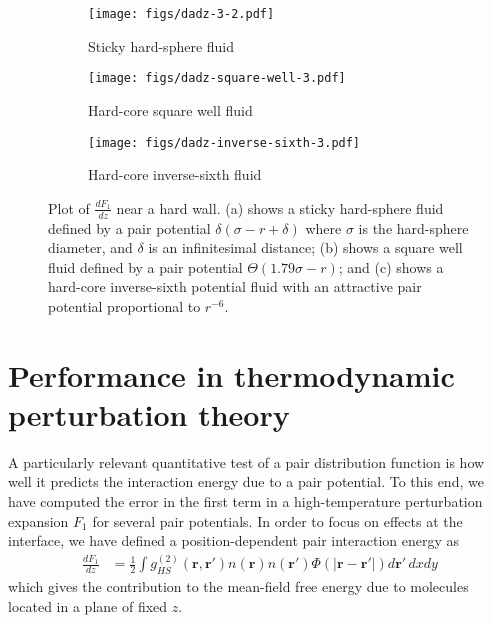 \documentclass[letterpaper,twocolumn,amsmath,amssymb,pre,aps,10pt]{revtex4-1}
\newcommand{\rr}{\textbf{r}}
\begin{document}
\begin{figure}
  \begin{subfigure}{1.0\columnwidth}
    \texttt{[image: figs/dadz-3-2.pdf]}
    \vspace{-0.8cm}
    \caption{Sticky hard-sphere fluid}\label{fig:dadz-delta}
  \end{subfigure}
  \begin{subfigure}{1.0\columnwidth}
    \texttt{[image: figs/dadz-square-well-3.pdf]}
    \vspace{-0.8cm}
    \caption{Hard-core square well fluid}\label{fig:dadz-square-well}
  \end{subfigure}
  \begin{subfigure}{1.0\columnwidth}
    \texttt{[image: figs/dadz-inverse-sixth-3.pdf]}
    \vspace{-0.8cm}
    \caption{Hard-core inverse-sixth fluid}\label{fig:dadz-inverse-sixth}
  \end{subfigure}
  \caption{Plot of $\frac{dF_1}{dz}$ near a hard wall.  (a) shows a
    sticky hard-sphere fluid defined by a pair potential
    $\delta(\sigma-r+\delta)$ where $\sigma$ is the hard-sphere
    diameter, and $\delta$ is an infinitesimal distance; (b) shows a
    square well fluid defined by a pair potential $\Theta(1.79
    \sigma-r)$; and (c) shows a hard-core inverse-sixth potential
    fluid with an attractive pair potential proportional to $r^{-6}$.
  }
  \label{fig:dadz}
\end{figure}

\section{Performance in thermodynamic perturbation theory}

A particularly relevant quantitative test of a pair distribution
function is how well it predicts the interaction energy due to a pair
potential.  To this end, we have computed the error in the first term
in a high-temperature perturbation expansion $F_1$
for several pair potentials.  In order to focus on effects at the
interface, we have defined a position-dependent pair interaction
energy as
\begin{align}
  \frac{dF_1}{dz} &=
  \tfrac12 \int g^{(2)}_{HS}(\rr,\rr')n(\rr)n(\rr')\Phi(|\rr-\rr'|)
  d\rr'\, dxdy\label{eq:da1}
\end{align}
which gives the contribution to the mean-field free energy due to
molecules located in a plane of fixed $z$.
\end{document}
